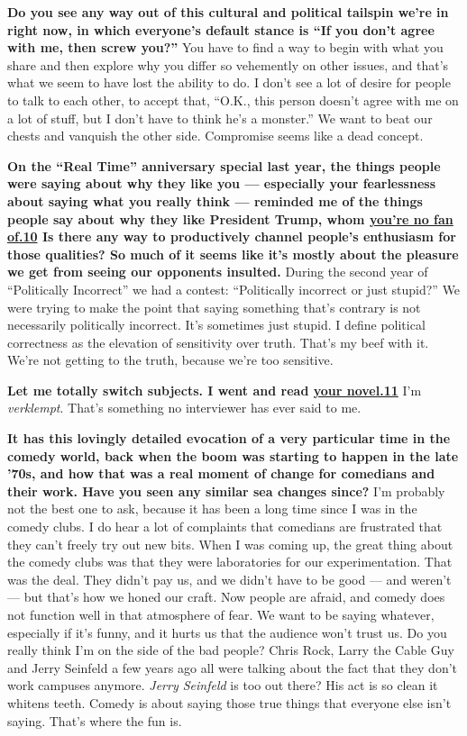 \textbf{Do you see any way out of this cultural and political tailspin
we're in right now, in which everyone's default stance is ``If you don't
agree with me, then screw you?''} You have to find a way to begin with
what you share and then explore why you differ so vehemently on other
issues, and that's what we seem to have lost the ability to do. I don't
see a lot of desire for people to talk to each other, to accept that,
``O.K., this person doesn't agree with me on a lot of stuff, but I don't
have to think he's a monster.'' We want to beat our chests and vanquish
the other side. Compromise seems like a dead concept.

\textbf{On the ``Real Time'' anniversary special last year, the things
people were saying about why they like you --- especially your
fearlessness about saying what you really think --- reminded me of the
things people say about why they like President Trump, whom
\href{http://nytimes3xbfgragh.onion\#tooltip-10}{you're no fan of.10} Is
there any way to productively channel people's enthusiasm for those
qualities? So much of it seems like it's mostly about the pleasure we
get from seeing our opponents insulted.} During the second year of
``Politically Incorrect'' we had a contest: ``Politically incorrect or
just stupid?'' We were trying to make the point that saying something
that's contrary is not necessarily politically incorrect. It's sometimes
just stupid. I define political correctness as the elevation of
sensitivity over truth. That's my beef with it. We're not getting to the
truth, because we're too sensitive.

\textbf{Let me totally switch subjects. I went and read
\href{http://nytimes3xbfgragh.onion\#tooltip-11}{your novel.11}} I'm
\emph{verklempt}. That's something no interviewer has ever said to me.

\textbf{It has this lovingly detailed evocation of a very particular
time in the comedy world, back when the boom was starting to happen in
the late '70s, and how that was a real moment of change for comedians
and their work. Have you seen any similar sea changes since?} I'm
probably not the best one to ask, because it has been a long time since
I was in the comedy clubs. I do hear a lot of complaints that comedians
are frustrated that they can't freely try out new bits. When I was
coming up, the great thing about the comedy clubs was that they were
laboratories for our experimentation. That was the deal. They didn't pay
us, and we didn't have to be good --- and weren't --- but that's how we
honed our craft. Now people are afraid, and comedy does not function
well in that atmosphere of fear. We want to be saying whatever,
especially if it's funny, and it hurts us that the audience won't trust
us. Do you really think I'm on the side of the bad people? Chris Rock,
Larry the Cable Guy and Jerry Seinfeld a few years ago all were talking
about the fact that they don't work campuses anymore. \emph{Jerry
Seinfeld} is too out there? His act is so clean it whitens teeth. Comedy
is about saying those true things that everyone else isn't saying.
That's where the fun is.

